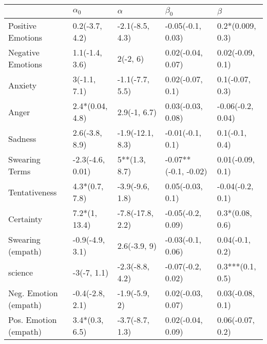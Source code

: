 \begin{tabular}{lllll}
\toprule
{} &        $\alpha_0$ &          $\alpha$ &             $\beta_0$ &            $\beta$ \\
\midrule
Positive Emotions     &    0.2(-3.7, 4.2) &   -2.1(-8.5, 4.3) &     -0.05(-0.1, 0.03) &   0.2*(0.009, 0.3) \\
Negative Emotions     &    1.1(-1.4, 3.6) &          2(-2, 6) &     0.02(-0.04, 0.07) &   0.02(-0.09, 0.1) \\
Anxiety               &      3(-1.1, 7.1) &   -1.1(-7.7, 5.5) &      0.02(-0.07, 0.1) &    0.1(-0.07, 0.3) \\
Anger                 &   2.4*(0.04, 4.8) &      2.9(-1, 6.7) &     0.03(-0.03, 0.08) &  -0.06(-0.2, 0.04) \\
Sadness               &    2.6(-3.8, 8.9) &  -1.9(-12.1, 8.3) &      -0.01(-0.1, 0.1) &     0.1(-0.1, 0.4) \\
Swearing Terms        &  -2.3(-4.6, 0.01) &     5**(1.3, 8.7) &  -0.07**(-0.1, -0.02) &   0.01(-0.09, 0.1) \\
Tentativeness         &    4.3*(0.7, 7.8) &   -3.9(-9.6, 1.8) &      0.05(-0.03, 0.1) &   -0.04(-0.2, 0.1) \\
Certainty             &     7.2*(1, 13.4) &  -7.8(-17.8, 2.2) &     -0.05(-0.2, 0.09) &    0.3*(0.08, 0.6) \\
Swearing (empath)     &   -0.9(-4.9, 3.1) &      2.6(-3.9, 9) &     -0.03(-0.1, 0.06) &    0.04(-0.1, 0.2) \\
science               &       -3(-7, 1.1) &   -2.3(-8.8, 4.2) &     -0.07(-0.2, 0.02) &   0.3***(0.1, 0.5) \\
Neg. Emotion (empath) &   -0.4(-2.8, 2.1) &     -1.9(-5.9, 2) &     0.02(-0.03, 0.07) &   0.03(-0.08, 0.1) \\
Pos. Emotion (empath) &    3.4*(0.3, 6.5) &   -3.7(-8.7, 1.3) &     0.02(-0.04, 0.09) &   0.06(-0.07, 0.2) \\
\bottomrule
\end{tabular}
